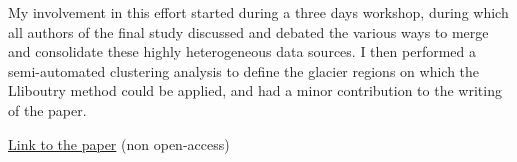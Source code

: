 My involvement in this effort started during a three days workshop, during which all authors
of the final study discussed and debated the various ways to merge and consolidate these highly heterogeneous
data sources. I then performed a semi-automated clustering analysis to define the glacier regions
on which the Lliboutry method could be applied, and had a minor contribution to the writing of the
paper.

\href{https://doi.org/10.1038/s41586-019-1071-0}{Link to the paper} (non open-access)

\iflong  \else \fi 

